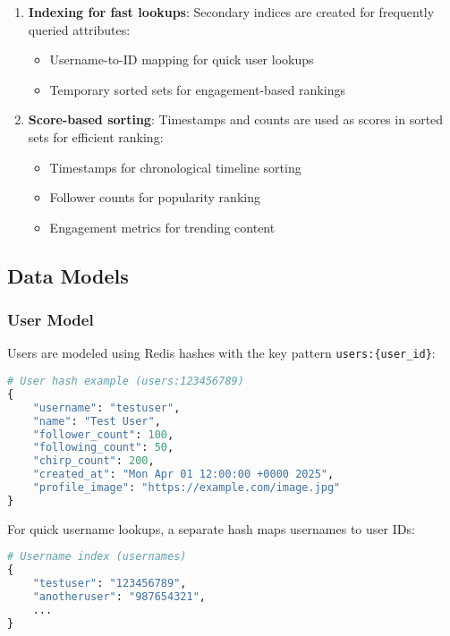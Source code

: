 \documentclass[a4paper,11pt]{article}
\begin{document}
\begin{enumerate}
    \item \textbf{Indexing for fast lookups}: Secondary indices are created for frequently queried attributes:
    \begin{itemize}
        \item Username-to-ID mapping for quick user lookups
        \item Temporary sorted sets for engagement-based rankings
    \end{itemize}
    
    \item \textbf{Score-based sorting}: Timestamps and counts are used as scores in sorted sets for efficient ranking:
    \begin{itemize}
        \item Timestamps for chronological timeline sorting
        \item Follower counts for popularity ranking
        \item Engagement metrics for trending content
    \end{itemize}
\end{enumerate}

\subsection{Data Models}

\subsubsection{User Model}
Users are modeled using Redis hashes with the key pattern \texttt{users:\{user\_id\}}:

\begin{lstlisting}[language=Python, caption=User data structure in Redis]
# User hash example (users:123456789)
{
    "username": "testuser",
    "name": "Test User",
    "follower_count": 100,
    "following_count": 50,
    "chirp_count": 200,
    "created_at": "Mon Apr 01 12:00:00 +0000 2025",
    "profile_image": "https://example.com/image.jpg"
}
\end{lstlisting}

For quick username lookups, a separate hash maps usernames to user IDs:

\begin{lstlisting}[language=Python, caption=Username to user ID mapping]
# Username index (usernames)
{
    "testuser": "123456789",
    "anotheruser": "987654321",
    ...
}
\end{lstlisting}
\end{document}
